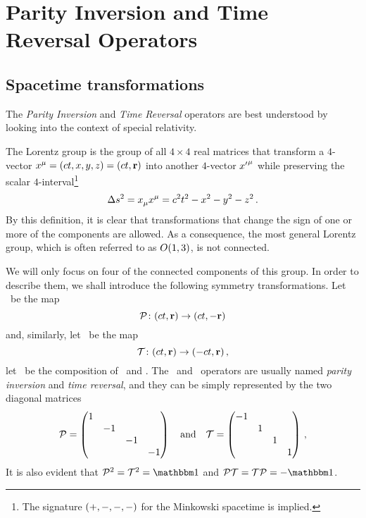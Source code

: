 \chapter{Parity Inversion and Time Reversal Operators}\label{ch:pt-operators}
    \section{Spacetime transformations}\label{s:spacetime-transformations}
        The \emph{Parity Inversion} and \emph{Time Reversal} operators are best understood by looking into the context of special relativity.

        The Lorentz group is the group of all $4\times4$ real matrices that transform a $4$-vector $\tensor{x}{^\mu} = \pqty{ct,x,y,z} = \pqty{ct,\vb{r}}$ into another $4$-vector $\tensor{{x'}}{^\mu}$ while preserving the scalar $4$-interval\footnote{The signature $\pqty{+,-,-,-}$ for the Minkowski spacetime is implied.}
        \begin{equation}
            \label{eq:4-interval}
            \Delta s^2
            = \tensor{x}{_\mu} \tensor{x}{^\mu}
            = c^2t^2 - x^2 - y^2 - z^2
            \myperiod
        \end{equation}
        By this definition, it is clear that transformations that change the sign of one or more of the components are allowed. As a consequence, the most general Lorentz group, which is often referred to as $O\pqty{1,3}$, is not connected.

        We will only focus on four of the connected components of this group. In order to describe them, we shall introduce the following symmetry transformations. Let \mcP\ be the map 
        \begin{equation}
            \label{eq:lorentz-P}
            \func{\mcP}{\pqty{ct,\vb{r}}}{\pqty{ct,-\vb{r}}}
        \end{equation}
        and, similarly, let \mcT\ be the map
        \begin{equation}
            \label{eq:lorentz-T}
            \func{\mcT}{\pqty{ct,\vb{r}}}{\pqty{-ct,\vb{r}}}
            \mycomma
        \end{equation}
        let \PT\ be the composition of \mcP\ and \mcT.
        The \mcP\ and \mcT\ operators are usually named \emph{parity inversion} and \emph{time reversal}, and they can be simply represented by the two diagonal matrices
        \begin{equation*}
            \mcP = \pmqty{\dmat{1,-1,-1,-1}}
            \qand
            \mcT = \pmqty{\dmat{-1,1,1,1}}
            \mycomma
        \end{equation*}
        It is also evident that $\mcP^2 = \mcT^2 = \idM$ and $\PT = \mcT\mcP = -\idM$.
        
